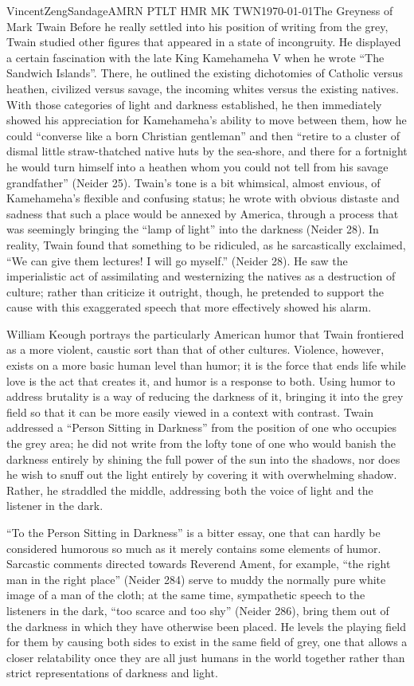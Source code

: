 \documentclass{article}[12pt]
\begin{document}
\begin{mla}{Vincent}{Zeng}{Sandage}{AMRN PTLT HMR MK TWN}{\today}{The Greyness of Mark Twain}
Before he really settled into his position of writing from the grey, Twain studied other figures that appeared in a state of incongruity. He displayed a certain fascination with the late King Kamehameha V when he wrote ``The Sandwich Islands''. There, he outlined the existing dichotomies of Catholic versus heathen, civilized versus savage, the incoming whites versus the existing natives. With those categories of light and darkness established, he then immediately showed his appreciation for Kamehameha's ability to move between them, how he could ``converse like a born Christian gentleman'' and then ``retire to a cluster of dismal little straw-thatched native huts by the sea-shore, and there for a fortnight he would turn himself into a heathen whom you could not tell from his savage grandfather'' (Neider 25). Twain's tone is a bit whimsical, almost envious, of Kamehameha's flexible and confusing status; he wrote with obvious distaste and sadness that such a place would be annexed by America, through a process that was seemingly bringing the ``lamp of light'' into the darkness (Neider 28). In reality, Twain found that something to be ridiculed, as he sarcastically exclaimed, ``We can give them lectures! I will go myself.'' (Neider 28). He saw the imperialistic act of assimilating and westernizing the natives as a destruction of culture; rather than criticize it outright, though, he pretended to support the cause with this exaggerated speech that more effectively showed his alarm.

William Keough portrays the particularly American humor that Twain frontiered as a more violent, caustic sort than that of other cultures. Violence, however, exists on a more basic human level than humor; it is the force that ends life while love is the act that creates it, and humor is a response to both. Using humor to address brutality is a way of reducing the darkness of it, bringing it into the grey field so that it can be more easily viewed in a context with contrast. Twain addressed a ``Person Sitting in Darkness'' from the position of one who occupies the grey area; he did not write from the lofty tone of one who would banish the darkness entirely by shining the full power of the sun into the shadows, nor does he wish to snuff out the light entirely by covering it with overwhelming shadow. Rather, he straddled the middle, addressing both the voice of light and the listener in the dark.

``To the Person Sitting in Darkness'' is a bitter essay, one that can hardly be considered humorous so much as it merely contains some elements of humor. Sarcastic comments directed towards Reverend Ament, for example, ``the right man in the right place'' (Neider 284) serve to muddy the normally pure white image of a man of the cloth; at the same time, sympathetic speech to the listeners in the dark, ``too scarce and too shy'' (Neider 286), bring them out of the darkness in which they have otherwise been placed. He levels the playing field for them by causing both sides to exist in the same field of grey, one that allows a closer relatability once they are all just humans in the world together rather than strict representations of darkness and light.


\end{mla}
\end{document}
